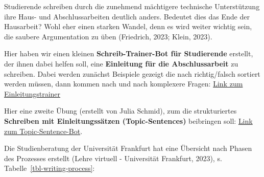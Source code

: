 \documentclass[
  ngerman,
  letterpaper,
  DIV=11]{scrreprt}
\begin{document}
Studierende schreiben durch die zunehmend mächtigere technische
Unterstützung ihre Haus- und Abschlussarbeiten deutlich anders. Bedeutet
dies das Ende der Hausarbeit? Wohl eher einen starken Wandel, denn es
wird weiter wichtig sein, die saubere Argumentation zu üben (Friedrich,
2023; Klein, 2023).

\begin{tcolorbox}[enhanced jigsaw, left=2mm, bottomrule=.15mm, arc=.35mm, rightrule=.15mm, colframe=quarto-callout-tip-color-frame, coltitle=black, colback=white, toprule=.15mm, toptitle=1mm, colbacktitle=quarto-callout-tip-color!10!white, title=\textcolor{quarto-callout-tip-color}{\faLightbulb}\hspace{0.5em}{Probieren Sie mal}, opacitybacktitle=0.6, leftrule=.75mm, bottomtitle=1mm, titlerule=0mm, opacityback=0, breakable]

Hier haben wir einen kleinen \textbf{Schreib-Trainer-Bot für
Studierende} erstellt, der ihnen dabei helfen soll, eine
\textbf{Einleitung für die Abschlussarbeit} zu schreiben. Dabei werden
zunächst Beispiele gezeigt die nach richtig/falsch sortiert werden
müssen, dann kommen nach und nach komplexere Fragen:
\href{https://chatgpt.com/g/g-68767cb33afc8191b1cfb9da1ed5c15a-bot-1-einleitungstrainer}{Link
zum Einleitungstrainer}

Hier eine zweite Übung (erstellt von Julia Schmid), zum die
strukturiertes \textbf{Schreiben mit Einleitungssätzen
(Topic-Sentences)} beibringen soll:
\href{https://chatgpt.com/g/g-68768c3031c08191b752ef66df258979-topic-sentence-bot}{Link
zum Topic-Sentence-Bot}.

\end{tcolorbox}

Die Studienberatung der Universität Frankfurt hat eine Übersicht nach
Phasen des Prozesses erstellt (Lehre virtuell - Universität Frankfurt,
2023), s. Tabelle~\ref{tbl-writing-process}:
\end{document}
